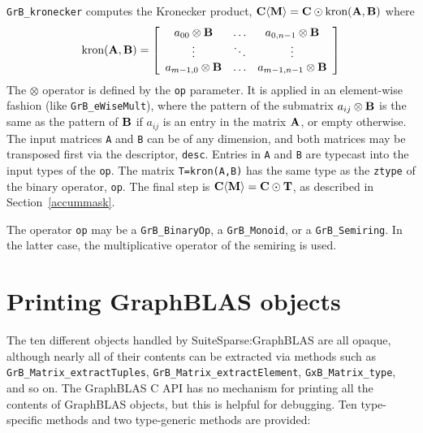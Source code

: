 \documentclass[12pt]{article}
\begin{document}
{\verb'GrB_kronecker' computes the Kronecker product,
${\bf C \langle M \rangle = C \odot \mbox{kron}(A,B)}$ where
\[
\mbox{kron}{\bf (A,B)} =
\left[
    \begin{array}{ccc}
    a_{00} \otimes {\bf B} & \ldots & a_{0,n-1} \otimes {\bf B} \\
    \vdots & \ddots & \vdots \\
    a_{m-1,0} \otimes {\bf B} & \ldots & a_{m-1,n-1} \otimes {\bf B} \\
    \end{array}
\right]
\]
The $\otimes$ operator is defined by the \verb'op' parameter.  It is applied in
an element-wise fashion (like \verb'GrB_eWiseMult'), where the pattern of the
submatrix $a_{ij} \otimes {\bf B}$ is the same as the pattern of ${\bf B}$ if
$a_{ij}$ is an entry in the matrix ${\bf A}$, or empty otherwise.  The input
matrices \verb'A' and \verb'B' can be of any dimension, and both matrices may
be transposed first via the descriptor, \verb'desc'.  Entries in \verb'A' and
\verb'B' are typecast into the input types of the \verb'op'.  The matrix
\verb'T=kron(A,B)' has the same type as the \verb'ztype' of the binary
operator, \verb'op'.  The final step is ${\bf C \langle M \rangle  = C \odot
T}$, as described in Section~\ref{accummask}.

The operator \verb'op' may be a \verb'GrB_BinaryOp', a \verb'GrB_Monoid', or a
\verb'GrB_Semiring'.  In the latter case, the multiplicative operator of
the semiring is used.

\newpage
\section{Printing GraphBLAS objects} %
\label{fprint}

The ten different objects handled by SuiteSparse:GraphBLAS are all opaque,
although nearly all of their contents can be extracted via methods such as
\verb'GrB_Matrix_extractTuples', \verb'GrB_Matrix_extractElement',
\verb'GxB_Matrix_type', and so on.  The GraphBLAS C API has no mechanism for
printing all the contents of GraphBLAS objects, but this is helpful for
debugging.  Ten type-specific methods and two type-generic methods are
provided:

}
\end{document}
